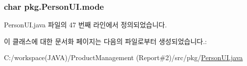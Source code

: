 \subsubsection[{\texorpdfstring{mode}{mode}}]{\setlength{\rightskip}{0pt plus 5cm}char pkg.\+Person\+U\+I.\+mode\hspace{0.3cm}{\ttfamily [private]}}\hypertarget{classpkg_1_1_person_u_i_a1e904b333d5a5ed5fccbd652278af776}{}\label{classpkg_1_1_person_u_i_a1e904b333d5a5ed5fccbd652278af776}


Person\+U\+I.\+java 파일의 47 번째 라인에서 정의되었습니다.



이 클래스에 대한 문서화 페이지는 다음의 파일로부터 생성되었습니다.\+:\begin{DoxyCompactItemize}
\item 
C\+:/workspace(\+J\+A\+V\+A)/\+Product\+Management (\+Report\#2)/src/pkg/\hyperlink{_person_u_i_8java}{Person\+U\+I.\+java}\end{DoxyCompactItemize}
